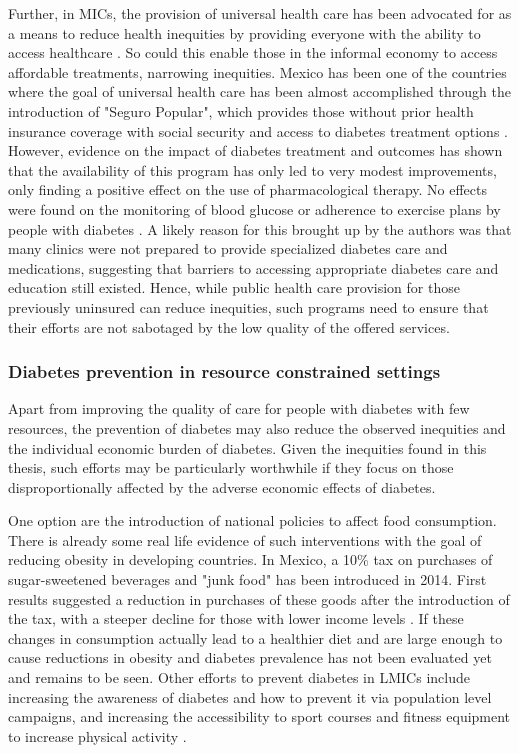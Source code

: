 Further, in \acp{MIC}, the provision of universal health care has been advocated for as a means to reduce health inequities by providing everyone with the ability to access healthcare \parencite{Marmot2008}. So could this enable those in the informal economy to access affordable treatments, narrowing inequities.  Mexico has been one of the countries where the goal of universal health care has been almost accomplished through the introduction of "Seguro Popular", which provides those without prior health insurance coverage with social security and access to diabetes treatment options \parencite{Knaul2012,Rivera-Hernandez2016}. However, evidence on the impact of diabetes treatment and outcomes has shown that the availability of this program has only led to very modest improvements, only finding a positive effect on the use of pharmacological therapy. No effects were found on the monitoring of blood glucose or adherence to exercise plans by people with diabetes \parencite{Rivera-Hernandez2016}. A likely reason for this brought up by the authors was that many clinics were not prepared to provide specialized diabetes care and medications, suggesting that barriers to accessing appropriate diabetes care and education still existed. Hence, while public health care provision for those previously uninsured can reduce inequities, such programs need to ensure that their efforts are not sabotaged by the low quality of the offered services.

\subsubsection*{Diabetes prevention in resource constrained settings}

Apart from improving the quality of care for people with diabetes with few resources, the prevention of diabetes may also reduce the observed inequities and the individual economic burden of diabetes. Given the inequities found in this thesis, such efforts may be particularly worthwhile if they focus on those disproportionally affected by the adverse economic effects of diabetes.

One option are the introduction of national policies to affect food consumption. There is already some real life evidence of such interventions with the goal of reducing obesity in developing countries. In Mexico, a 10\% tax on purchases of sugar-sweetened beverages and "junk food" has been introduced in 2014. First results suggested a reduction in purchases of these goods after the introduction of the tax, with a steeper decline for those with lower income levels \parencite{Colchero2016,Batis2016}. If these changes in consumption actually lead to a healthier diet and are large enough to cause reductions in obesity and diabetes prevalence has not been evaluated yet and remains to be seen. Other efforts to prevent diabetes in \acp{LMIC} include increasing the awareness of diabetes and how to prevent it via population level campaigns, and  increasing the accessibility to sport courses and fitness equipment to increase physical activity \textcite{Cefalu2016}. 

